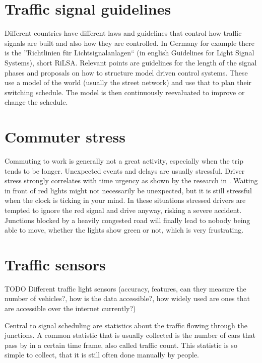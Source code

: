 \section{Traffic signal guidelines}

Different countries have different laws and guidelines that control how traffic signals are built and also how they are controlled.
In Germany for example there is the ''Richtlinien für Lichtsignalanlagen`` (in english Guidelines for Light Signal Systems), short RiLSA. Relevant points are guidelines for the length of the signal phases and proposals on how to structure model driven control systems. These use a model of the world (usually the street network) and use that to plan their switching schedule. The model is then continuously reevaluated to improve or change the schedule.

\section{Commuter stress}
\label{commuter_stress}

Commuting to work is generally not a great activity, especially when the trip tends to be longer. Unexpected events and delays are usually stressful. Driver stress strongly correlates with time urgency as shown by the research in \cite{aggressive_behaviour}. Waiting in front of red lights might not necessarily be unexpected, but it is still stressful when the clock is ticking in your mind. In these situations stressed drivers are tempted to ignore the red signal and drive anyway, risking a severe accident. Junctions blocked by a heavily congested road will finally lead to nobody being able to move, whether the lights show green or not, which is very frustrating.

\section{Traffic sensors}
\label{trafficSensors}

TODO Different traffic light sensors (accuracy, features, can they measure the number of vehicles?, how is the data accessible?, how widely used are ones that are accessible over the internet currently?)

Central to signal scheduling are statistics about the traffic flowing through the junctions. A common statistic that is usually collected is the number of cars that pass by in a certain time frame, also called traffic count. This statistic is so simple to collect, that it is still often done manually by people.

